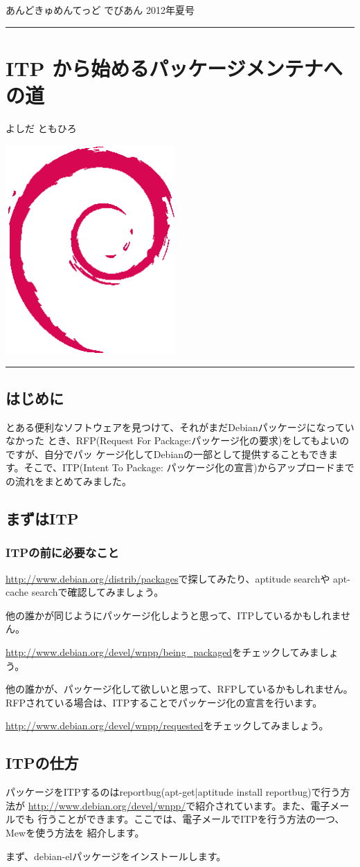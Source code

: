\documentclass[mingoth,a4paper]{jsarticle}
\renewcommand{\dancersection}[2]{%
\newpage
あんどきゅめんてっど でびあん 2012年夏号
%
\vspace{0.1mm}\\
{\color{dancerdarkblue}\rule{\hsize}{2mm}}

%
%
\begin{minipage}[t]{0.6\hsize}
\color{dancerdarkblue}
\vspace{1cm}
\section{#1}
\hfill{}#2\\
\end{minipage}
\begin{minipage}[t]{0.4\hsize}
\vspace{-2cm}
\hfill{}\includegraphics[height=8cm]{image200502/openlogo-nd.eps}\\
\vspace{-5cm}
\end{minipage}
%
{\color{dancerlightblue}\rule{0.66\hsize}{2mm}}
%
\vspace{2cm}
}
\begin{document}
\clearpage
\dancersection{ITP から始めるパッケージメンテナへの道}{よしだ ともひろ}

\subsection{はじめに}
とある便利なソフトウェアを見つけて、それがまだDebianパッケージになっていなかった
とき、RFP(Request For Package:パッケージ化の要求)をしてもよいのですが、自分でパッ
ケージ化してDebianの一部として提供することもできます。そこで、ITP(Intent To Package:
パッケージ化の宣言)からアップロードまでの流れをまとめてみました。

\subsection{まずはITP}
\subsubsection{ITPの前に必要なこと}
\url{http://www.debian.org/distrib/packages}で探してみたり、aptitude searchや
apt-cache searchで確認してみましょう。

他の誰かが同じようにパッケージ化しようと思って、ITPしているかもしれません。

\url{http://www.debian.org/devel/wnpp/being\_packaged}をチェックしてみましょう。

他の誰かが、パッケージ化して欲しいと思って、RFPしているかもしれません。
RFPされている場合は、ITPすることでパッケージ化の宣言を行います。

\url{http://www.debian.org/devel/wnpp/requested}をチェックしてみましょう。

\subsection{ITPの仕方}
パッケージをITPするのはreportbug(apt-get|aptitude install reportbug)で行う方法が
\url{http://www.debian.org/devel/wnpp/}で紹介されています。また、電子メールでも
行うことができます。ここでは、電子メールでITPを行う方法の一つ、Mewを使う方法を
紹介します。

まず、debian-elパッケージをインストールします。
\end{document}
